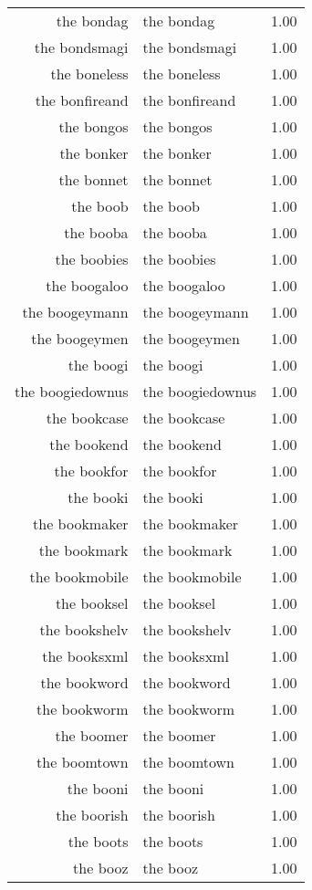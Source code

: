 \begin{table}[ht]
\begin{tabular}{rlr}
  the bondag & the bondag & 1.00 \\ 
  the bondsmagi & the bondsmagi & 1.00 \\ 
  the boneless & the boneless & 1.00 \\ 
  the bonfireand & the bonfireand & 1.00 \\ 
  the bongos & the bongos & 1.00 \\ 
  the bonker & the bonker & 1.00 \\ 
  the bonnet & the bonnet & 1.00 \\ 
  the boob & the boob & 1.00 \\ 
  the booba & the booba & 1.00 \\ 
  the boobies & the boobies & 1.00 \\ 
  the boogaloo & the boogaloo & 1.00 \\ 
  the boogeymann & the boogeymann & 1.00 \\ 
  the boogeymen & the boogeymen & 1.00 \\ 
  the boogi & the boogi & 1.00 \\ 
  the boogiedownus & the boogiedownus & 1.00 \\ 
  the bookcase & the bookcase & 1.00 \\ 
  the bookend & the bookend & 1.00 \\ 
  the bookfor & the bookfor & 1.00 \\ 
  the booki & the booki & 1.00 \\ 
  the bookmaker & the bookmaker & 1.00 \\ 
  the bookmark & the bookmark & 1.00 \\ 
  the bookmobile & the bookmobile & 1.00 \\ 
  the booksel & the booksel & 1.00 \\ 
  the bookshelv & the bookshelv & 1.00 \\ 
  the booksxml & the booksxml & 1.00 \\ 
  the bookword & the bookword & 1.00 \\ 
  the bookworm & the bookworm & 1.00 \\ 
  the boomer & the boomer & 1.00 \\ 
  the boomtown & the boomtown & 1.00 \\ 
  the booni & the booni & 1.00 \\ 
  the boorish & the boorish & 1.00 \\ 
  the boots & the boots & 1.00 \\ 
  the booz & the booz & 1.00 \\ 

\end{tabular}
\end{table}
